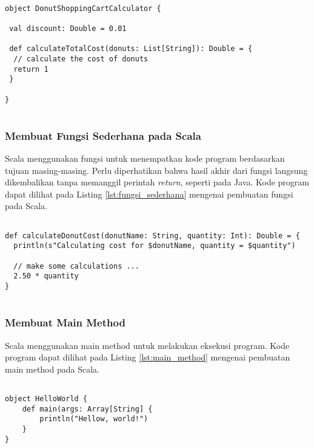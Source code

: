 \begin{lstlisting}[basicstyle=\ttfamily, frame=single,
	columns=fullflexible, keepspaces=true, breaklines=true, label=lst:kelas_object, caption=Membuat Kelas Object pada Scala]
	
object DonutShoppingCartCalculator {

 val discount: Double = 0.01

 def calculateTotalCost(donuts: List[String]): Double = {
  // calculate the cost of donuts
  return 1
 }
 
}
	
\end{lstlisting}

\newpage
\subsubsection{Membuat Fungsi Sederhana pada Scala}
Scala menggunakan fungsi untuk menempatkan kode program berdasarkan tujuan masing-masing. Perlu diperhatikan bahwa hasil akhir dari fungsi langsung dikembalikan tanpa memanggil perintah \textit{return}, seperti pada Java. Kode program dapat dilihat pada Listing \ref{lst:fungsi_sederhana} mengenai pembuatan fungsi pada Scala.

\begin{lstlisting}[basicstyle=\ttfamily, frame=single,
	columns=fullflexible, keepspaces=true, breaklines=true, label=lst:fungsi_sederhana, caption=Membuat Fungsi Sedehana pada Scala]
	
def calculateDonutCost(donutName: String, quantity: Int): Double = {
  println(s"Calculating cost for $donutName, quantity = $quantity")

  // make some calculations ...
  2.50 * quantity
}
	
\end{lstlisting}


\subsubsection{Membuat Main Method}
Scala menggunakan main method untuk melakukan eksekusi program. Kode program dapat dilihat pada Listing \ref{lst:main_method} mengenai pembuatan main method pada Scala.

\begin{lstlisting}[basicstyle=\ttfamily, frame=single,
	columns=fullflexible, keepspaces=true, breaklines=true, label=lst:main_method, caption=Membuat Main Method pada Scala]
	
object HelloWorld {
	def main(args: Array[String] {
		println("Hellow, world!")
	}
}
	
\end{lstlisting}

